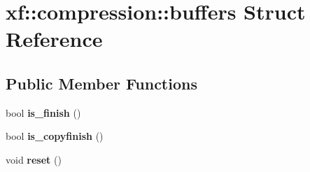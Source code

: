 \hypertarget{structxf_1_1compression_1_1buffers}{\section{xf\-:\-:compression\-:\-:buffers Struct Reference}
\label{structxf_1_1compression_1_1buffers}
}
\subsection*{Public Member Functions}
\begin{DoxyCompactItemize}
\item 
\hypertarget{structxf_1_1compression_1_1buffers_a466c8a11999f831539460966f7c6761f}{bool {\bfseries is\-\_\-finish} ()}\label{structxf_1_1compression_1_1buffers_a466c8a11999f831539460966f7c6761f}

\item 
\hypertarget{structxf_1_1compression_1_1buffers_a4bd7dd2ddd2401a4aae9bb75b58a1a3d}{bool {\bfseries is\-\_\-copyfinish} ()}\label{structxf_1_1compression_1_1buffers_a4bd7dd2ddd2401a4aae9bb75b58a1a3d}

\item 
\hypertarget{structxf_1_1compression_1_1buffers_a4e4c29d5dd403c8712d6f22091bf2ac9}{void {\bfseries reset} ()}\label{structxf_1_1compression_1_1buffers_a4e4c29d5dd403c8712d6f22091bf2ac9}

\end{DoxyCompactItemize}
